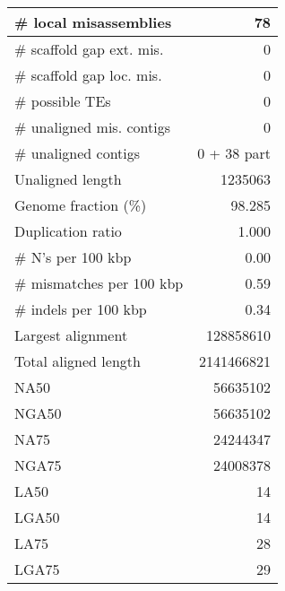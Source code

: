 \documentclass[12pt,a4paper]{article}
\begin{document}
\begin{table}[ht]
\begin{center}
\begin{tabular}{|l*{1}{|r}|}
\# local misassemblies & 78 \\ \hline
\# scaffold gap ext. mis. & 0 \\ \hline
\# scaffold gap loc. mis. & 0 \\ \hline
\# possible TEs & 0 \\ \hline
\# unaligned mis. contigs & 0 \\ \hline
\# unaligned contigs & 0 + 38 part \\ \hline
Unaligned length & 1235063 \\ \hline
Genome fraction (\%) & 98.285 \\ \hline
Duplication ratio & 1.000 \\ \hline
\# N's per 100 kbp & 0.00 \\ \hline
\# mismatches per 100 kbp & 0.59 \\ \hline
\# indels per 100 kbp & 0.34 \\ \hline
Largest alignment & 128858610 \\ \hline
Total aligned length & 2141466821 \\ \hline
NA50 & 56635102 \\ \hline
NGA50 & 56635102 \\ \hline
NA75 & 24244347 \\ \hline
NGA75 & 24008378 \\ \hline
LA50 & 14 \\ \hline
LGA50 & 14 \\ \hline
LA75 & 28 \\ \hline
LGA75 & 29 \\ \hline
\end{tabular}
\end{center}
\end{table}
\end{document}
